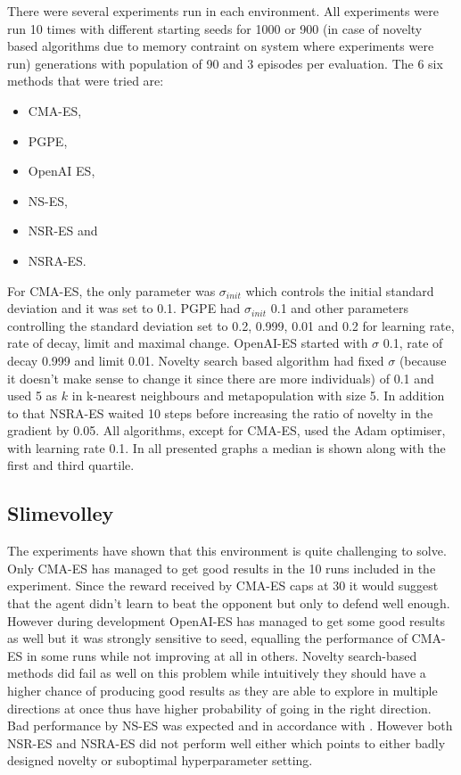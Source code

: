 There were several experiments run in each environment. All experiments were run 10 times with different starting seeds for 1000 or 900 (in case of novelty based algorithms due to memory contraint on system where experiments were run) generations with population of 90 and 3 episodes per evaluation. The 6 six methods that were tried are:
\begin{itemize}
    \item CMA-ES, 
    \item PGPE,
    \item OpenAI ES,
    \item NS-ES, 
    \item NSR-ES and
    \item NSRA-ES.
\end{itemize}

For CMA-ES, the only parameter was $\sigma_{init}$ which controls the initial standard deviation and it was set to 0.1. PGPE had $\sigma_{init}$ 0.1 and other parameters controlling the standard deviation set to 0.2, 0.999, 0.01 and 0.2 for learning rate, rate of decay, limit and maximal change. OpenAI-ES started with $\sigma$ 0.1, rate of decay 0.999 and limit 0.01. Novelty search based algorithm had fixed $\sigma$ (because it doesn't make sense to change it since there are more individuals) of 0.1 and used 5 as $k$ in k-nearest neighbours and metapopulation with size 5. In addition to that NSRA-ES waited 10 steps before increasing the ratio of novelty in the gradient by 0.05. All algorithms, except for CMA-ES, used the Adam \cite{kingma2017adam} optimiser, with learning rate 0.1. In all presented graphs a median is shown along with the first and third quartile.

\subsection{Slimevolley}

The experiments have shown that this environment is quite challenging to solve. Only CMA-ES has managed to get good results in the 10 runs included in the experiment. Since the reward received by CMA-ES caps at 30 it would suggest that the agent didn't learn to beat the opponent but only to defend well enough. However during development OpenAI-ES has managed to get some good results as well but it was strongly sensitive to seed, equalling the performance of CMA-ES in some runs while not improving at all in others. Novelty search-based methods did fail as well on this problem while intuitively they should have a higher chance of producing good results as they are able to explore in multiple directions at once thus have higher probability of going in the right direction. Bad performance by NS-ES was expected and in accordance with \cite{conti2018}. However both NSR-ES and NSRA-ES did not perform well either which points to either badly designed novelty or suboptimal hyperparameter setting. 

